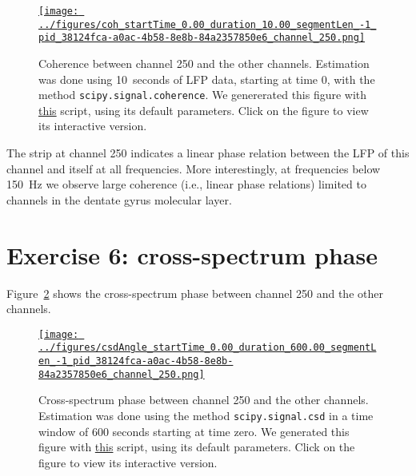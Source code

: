 \documentclass[12pt]{article}
\begin{document}
\begin{figure}[H]
    \begin{center}
        \href{https://www.gatsby.ucl.ac.uk/~rapela/neuroinformatics/2023/ws3/figures/coh_startTime_0.00_duration_10.00_segmentLen_-1_pid_38124fca-a0ac-4b58-8e8b-84a2357850e6_channel_250.html}{\texttt{[image: ../figures/coh\_startTime\_0.00\_duration\_10.00\_segmentLen\_-1\_pid\_38124fca-a0ac-4b58-8e8b-84a2357850e6\_channel\_250.png]}}

        \caption{Coherence between channel 250 and the other channels.
        Estimation was done using 10~seconds of LFP data, starting at time 0,
        with the method \texttt{scipy.signal.coherence}.
        We genererated this figure with
        \href{https://github.com/joacorapela/neuroinformatics23/blob/master/worksheets/ws3/mySolution/code/scripts/doPlotCoherence.py}{this}
        script, using its default parameters.
        Click on the figure to view its interactive version.}

                \label{fig:coherenceChannel250WithOthers}

            \end{center}
        \end{figure}

The strip at channel 250 indicates a linear phase relation between the LFP of
this channel and itself at all frequencies. More interestingly, at frequencies
below 150~Hz we observe large coherence (i.e., linear phase relations) limited
to channels in the dentate gyrus molecular layer.

\section*{Exercise 6: cross-spectrum phase}

Figure~\ref{fig:crossSpectrumPhaseChannel250WithOthers} shows the
cross-spectrum phase between
channel 250 and the other channels.

\begin{figure}[H]
    \begin{center}
        \href{https://www.gatsby.ucl.ac.uk/~rapela/neuroinformatics/2023/ws3/figures/csdAngle_startTime_0.00_duration_600.00_segmentLen_-1_pid_38124fca-a0ac-4b58-8e8b-84a2357850e6_channel_250.html}{\texttt{[image: ../figures/csdAngle\_startTime\_0.00\_duration\_600.00\_segmentLen\_-1\_pid\_38124fca-a0ac-4b58-8e8b-84a2357850e6\_channel\_250.png]}}

        \caption{Cross-spectrum phase between channel 250 and the other
        channels. Estimation was done using the method
        \texttt{scipy.signal.csd} in a time window of 600 seconds starting at
        time zero.  We generated this figure with 
        \href{https://github.com/joacorapela/neuroinformatics23/blob/master/worksheets/ws3/mySolution/code/scripts/doPlotCrossSpectrumPhase.py}{this}
        script, using its default parameters.
        Click on the figure to view its interactive version.}

        \label{fig:crossSpectrumPhaseChannel250WithOthers}

        \end{center}
\end{figure}
\end{document}
